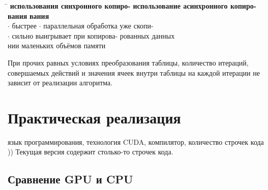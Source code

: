 \documentclass[a4paper,14pt,russian]{extreport}
\begin{document}
\par 
  \begin{tabbing}
  \hspace{0.5\textwidth} \= \hspace{0.5\textwidth} \kill
  {\bf использования синхронного копиро-} \> {\bf использование асинхронного копиро-} \\
  {\bf вания} \> {\bf вания} \\
  $\cdot$ быстрее \> $\cdot$ параллельная обработка уже скопи- \\
  $\cdot$ сильно выигрывает при копирова- \> рованных данных\\
  нии маленьких объёмов памяти \>  
  \end{tabbing}
\par При прочих равных условиях преобразования таблицы, количество итераций, совершаемых действий и значения ячеек внутри таблицы на каждой итерации не зависит от реализации алгоритма. 


\chapter{Практическая реализация} 
 
язык программирования, технология CUDA, компилятор, количество строчек кода )) Текущая версия содержит столько-то строчек кода. 


\section{Сравнение GPU и CPU} 
\end{document}
